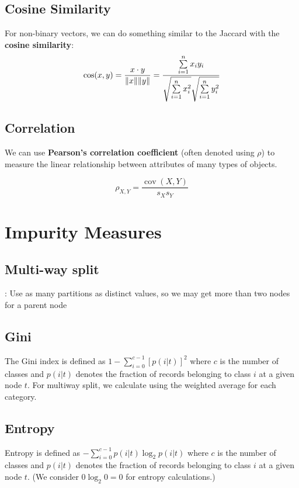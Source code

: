 \documentclass[12pt]{amsart}
\begin{document}
\subsection{Cosine Similarity}
For non-binary vectors, we can do something similar to the Jaccard with the \textbf{cosine similarity}:
\begin{equation*}
\cos(x,y)={x \cdot y \over \|x \| \| y \|}={\frac {\sum \limits _{i=1}^{n}{x_{i}y_{i}}}{{\sqrt {\sum \limits _{i=1}^{n}{x_{i}^{2}}}}{\sqrt {\sum \limits _{i=1}^{n}{y_{i}^{2}}}}}}
\end{equation*}


\subsection{Correlation}

We can use \textbf{Pearson's correlation coefficient} (often denoted using $\rho$) to measure the linear relationship between attributes of many types of objects. 

\begin{equation*}
\rho _{X,Y}={\frac {\operatorname {cov} (X,Y)}{s _{X}s _{Y}}}
\end{equation*}

\section{Impurity Measures}

\subsection{Multi-way split}: Use as many partitions as distinct values, so we may get more than two nodes for a parent node

\subsection{Gini}
The Gini index is defined as $1-\sum_{i=0}^{c-1} [p(i|t)]^2$ where $c$ is the number of classes and $p(i|t)$ denotes the fraction of records belonging to class $i$ at a given node $t$.
For multiway split, we calculate using the weighted average for each category.

\subsection{Entropy}
Entropy is defined as $-\sum_{i=0}^{c-1} p(i|t) \log_2 p(i|t)$ where $c$ is the number of classes and $p(i|t)$ denotes the fraction of records belonging to class $i$ at a given node $t$. (We consider $0 \log_2 0 = 0$ for entropy calculations.)
\end{document}
